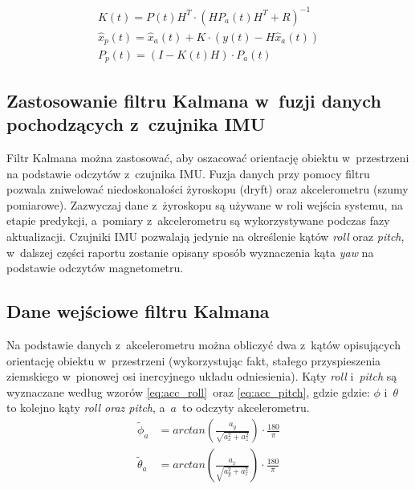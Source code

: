 \begin{gather}
	K\left(t\right) = P\left(t\right) H^T \cdot
	\left(HP_a\left(t\right)H^T + R\right)^{-1}
\label{eq:kalman_update_K} \\
	\hat{x}_p\left(t\right) = \hat{x}_a\left(t\right) +
	K\cdot\left(y\left(t\right) - H \hat{x}_a\left(t\right)\right)
\label{eq:kalman_update_x} \\
	P_p\left(t\right) = \left(I - K\left(t\right)H\right) \cdot P_a\left(t\right)
	\label{eq:kalman_update_P}
\end{gather}

\subsection{Zastosowanie filtru Kalmana w~fuzji danych pochodzących z~czujnika
            IMU}
Filtr Kalmana można zastosować, aby oszacować orientację obiektu w~przestrzeni
na podstawie odczytów z~czujnika IMU.
Fuzja danych przy pomocy filtru pozwala zniwelować niedoskonałości żyroskopu
(dryft) oraz akcelerometru (szumy pomiarowe).
Zazwyczaj dane z~żyroskopu są używane w roli wejścia systemu, na etapie
predykcji, a~pomiary z~akcelerometru są wykorzystywane podczas fazy
aktualizacji.
Czujniki IMU pozwalają jedynie na określenie kątów \textit{roll} oraz
\textit{pitch}, w~dalszej części raportu zostanie opisany sposób wyznaczenia
kąta \textit{yaw} na podstawie odczytów magnetometru.

\subsection{Dane wejściowe filtru Kalmana}
Na podstawie danych z~akcelerometru można obliczyć dwa z~kątów opisujących
orientację obiektu w~przestrzeni (wykorzystując fakt, stałego przyspieszenia
ziemskiego w~pionowej osi inercyjnego układu odniesienia).
Kąty \textit{roll} i~\textit{pitch} są wyznaczane według wzorów
\ref{eq:acc_roll}~oraz \ref{eq:acc_pitch}, gdzie gdzie: $ \phi $ i~$ \theta $
to kolejno kąty \textit{roll oraz pitch}, a~$ a $~to odczyty akcelerometru.
\begin{align}
	\tilde\phi_a &= arctan\left(\frac{a_y}{\sqrt{a_x^2 + a_z^2}}\right)
	\cdot
	\frac{180}{\pi}
	\label{eq:acc_roll} \\
	\tilde\theta_a &= arctan\left(\frac{a_x}{\sqrt{a_y^2 + a_z^2}}\right)
	\cdot
	\frac{180}{\pi}
	\label{eq:acc_pitch}
\end{align}


